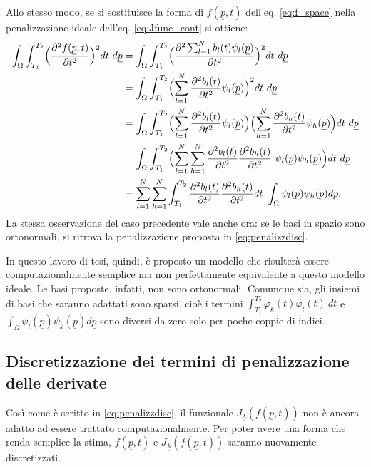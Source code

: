 \documentclass[a4paper,11pt,twoside,openright]{book}							%
\begin{document}
Allo stesso modo, se si sostituisce la forma di $f(\underline p,t)$ dell'eq. \ref{eq:f_space} nella penalizzazione ideale dell'eq. \ref{eq:Jfunc_cont} si ottiene:
\begin{equation} 
\label{eq:espansione_funzinf_sp}
\begin{split}
\int_\Omega \int_{T_1}^{T_2} \Bigl( \frac{\partial^2 f(\underline p, t) }{\partial t ^2} \Bigr)^2 dt\ d\underline p 
&=\int_\Omega \int_{T_1}^{T_2} \Bigl( \frac{\partial^2 \sum_{l=1}^N b_l(t)\psi_l(\underline p) }{\partial t ^2} \Bigr)^2 dt\ d\underline p \\
&=\int_\Omega \int_{T_1}^{T_2} \Bigl( \sum_{l=1}^N \frac{ \partial^2b_l(t)}{\partial t ^2}\psi_l(\underline p)  \Bigr)^2 dt\ d\underline p  \\
&=\int_\Omega \int_{T_1}^{T_2} \Bigl( \sum_{l=1}^N \frac{ \partial^2b_l(t)}{\partial t ^2}\psi_l(\underline p)  \Bigr)\Bigl( \sum_{h=1}^N \frac{ \partial^2b_h(t)}{\partial t ^2}\psi_h(\underline p)  \Bigr) dt\ d\underline p \\
&= \int_\Omega \int_{T_1}^{T_2} \Bigl( \sum_{l=1}^N \sum_{h=1}^N \frac{ \partial^2b_l(t)}{\partial t ^2}\frac{ \partial^2b_h(t)}{\partial t ^2}\   \psi_l(\underline p)  \psi_h(\underline p)  \Bigr) dt\ d\underline p \\
&=\sum_{l=1}^N \sum_{h=1}^N  \int_{T_1}^{T_2}  \frac{ \partial^2b_l(t)}{\partial t ^2}\frac{ \partial^2b_h(t)}{\partial t ^2}dt\  \int_\Omega \psi_l(\underline p)  \psi_h(\underline p)    d\underline p .
\end{split}
\end{equation}
La stessa osservazione del caso precedente vale anche ora: se le basi in spazio sono ortonormali, si ritrova la penalizzazione proposta in \ref{eq:penalizzdisc}. 

In questo lavoro di tesi, quindi, è proposto un modello che risulterà essere computazionalmente semplice ma non perfettamente equivalente a questo modello ideale. Le basi proposte, infatti, non sono ortonormali. Comunque sia, gli insiemi di basi che saranno adattati sono sparsi, cioè i termini $ \int_{T_1}^{T_2} \varphi_k(t)\varphi_l(t)\ dt $ e $\int_\Omega \psi_l(\underline p)  \psi_k(\underline p)d\underline p$ sono diversi da zero solo per poche coppie di indici.






\subsection*{Discretizzazione dei termini di penalizzazione delle derivate}
Così come è scritto in \ref{eq:penalizzdisc}, il funzionale $J_{\underline \lambda }(f(\underline{p},t))$ non è ancora adatto ad essere trattato computazionalmente. Per poter avere una forma che renda semplice la stima, $f(\underline{p},t)$ e $J_{\underline \lambda }(f(\underline{p},t))$ saranno nuovamente discretizzati. 
\end{document}
